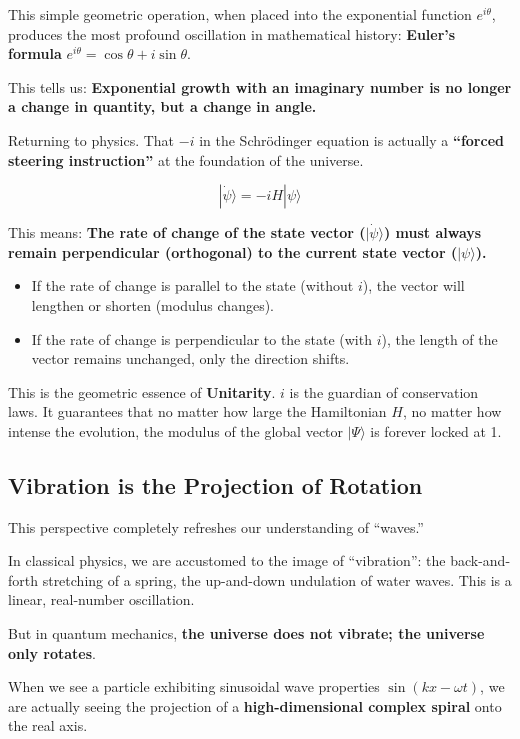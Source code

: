This simple geometric operation, when placed into the exponential function $e^{i\theta}$, produces the most profound oscillation in mathematical history: \textbf{Euler's formula} $e^{i\theta} = \cos\theta + i\sin\theta$.

This tells us: \textbf{Exponential growth with an imaginary number is no longer a change in quantity, but a change in angle.}

Returning to physics. That $-i$ in the Schrödinger equation is actually a \textbf{``forced steering instruction''} at the foundation of the universe.

$$|\dot{\psi}\rangle = -i H |\psi\rangle$$

This means: \textbf{The rate of change of the state vector ($|\dot{\psi}\rangle$) must always remain perpendicular (orthogonal) to the current state vector ($|\psi\rangle$).}

\begin{itemize}
\item If the rate of change is parallel to the state (without $i$), the vector will lengthen or shorten (modulus changes).

\item If the rate of change is perpendicular to the state (with $i$), the length of the vector remains unchanged, only the direction shifts.
\end{itemize}

This is the geometric essence of \textbf{Unitarity}. $i$ is the guardian of conservation laws. It guarantees that no matter how large the Hamiltonian $H$, no matter how intense the evolution, the modulus of the global vector $|\Psi\rangle$ is forever locked at 1.

\subsection{Vibration is the Projection of Rotation}

This perspective completely refreshes our understanding of ``waves.''

In classical physics, we are accustomed to the image of ``vibration'': the back-and-forth stretching of a spring, the up-and-down undulation of water waves. This is a linear, real-number oscillation.

But in quantum mechanics, \textbf{the universe does not vibrate; the universe only rotates}.

When we see a particle exhibiting sinusoidal wave properties $\sin(kx - \omega t)$, we are actually seeing the projection of a \textbf{high-dimensional complex spiral} onto the real axis.

